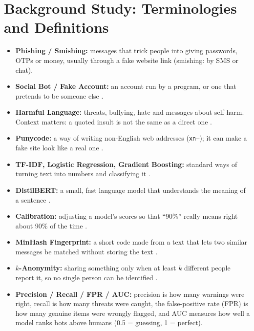 \section{Background Study: Terminologies and Definitions}
\begin{itemize}
\item \textbf{Phishing / Smishing:} messages that trick people into giving passwords, OTPs or money, usually through a fake website link (smishing: by SMS or chat).
\item \textbf{Social Bot / Fake Account:} an account run by a program, or one that pretends to be someone else \cite{lit3}.
\item \textbf{Harmful Language:} threats, bullying, hate and messages about self-harm. Context matters: a quoted insult is not the same as a direct one \cite{cad}.
\item \textbf{Punycode:} a way of writing non-English web addresses (\texttt{xn--}); it can make a fake site look like a real one \cite{homograph}.
\item \textbf{TF-IDF, Logistic Regression, Gradient Boosting:} standard ways of turning text into numbers and classifying it \cite{sklearn}.
\item \textbf{DistilBERT:} a small, fast language model that understands the meaning of a sentence \cite{distilbert}.
\item \textbf{Calibration:} adjusting a model's scores so that ``90\%'' really means right about 90\% of the time \cite{guo}.
\item \textbf{MinHash Fingerprint:} a short code made from a text that lets two similar messages be matched without storing the text \cite{broder}.
\item \textbf{$k$-Anonymity:} sharing something only when at least $k$ different people report it, so no single person can be identified \cite{sweeney}.
\item \textbf{Precision / Recall / FPR / AUC:} precision is how many warnings were right, recall is how many threats were caught, the false-positive rate (FPR) is how many genuine items were wrongly flagged, and AUC measures how well a model ranks bots above humans (0.5 = guessing, 1 = perfect).
\end{itemize}

